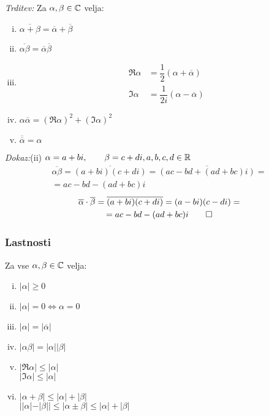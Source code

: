\emph{Trditev:} Za $\alpha, \beta \in \mathbb{C}$ velja:
\begin{enumerate}[(i)]
	\item $\overline{\alpha + \beta} = \overline{\alpha} + \overline{\beta}$
	\item $\overline{\alpha \beta} = \overline{\alpha} \overline{\beta}$
	\item \begin{align*}
	\Re \alpha  &= \dfrac{1}{2} (\alpha + \overline{\alpha})\\
	\Im \alpha &= \dfrac{1}{2i} (\alpha - \overline{\alpha})
	\end{align*}
	
	\item $\alpha \overline{\alpha} = (\Re \alpha)^2 + (\Im \alpha)^2$
	\item $\overline{\overline{\alpha}} = \alpha$
\end{enumerate}

\emph{Dokaz:}(ii) $\alpha = a + bi, \qquad \beta = c + di, a, b, c, d \in \mathbb{R}$
\begin{multline*}
\overline{\alpha \beta}	 = \overline{(a + bi)(c + di)} = \overline{(ac - bd + (ad + bc)i)} = \\
= ac - bd - (ad + bc)i
\end{multline*}
\begin{multline*}
	\overline{\alpha} \cdot \overline{\beta} = \overline{(a + bi)} \overline{(c + di)} = (a-bi)(c-di) =\\
	= ac-bd-(ad+bc)i \qed
\end{multline*}

\subsubsection{Lastnosti} 
Za vse $\alpha, \beta \in \mathbb{C}$ velja:
\begin{enumerate}[(i)]
	\item $|\alpha| \geq 0$
	\item $|\alpha| = 0 \iff \alpha = 0$
	\item $|\alpha| = |\overline{\alpha}|$
	\item $|\alpha \beta| = |\alpha| |\beta|$
	\item $|\Re \alpha| \leq |\alpha|$\\
	$|\Im \alpha| \leq |\alpha|$
	
	\item $|\alpha + \beta| \leq |\alpha| + |\beta|$\\
	$||\alpha| - |\beta|| \leq |\alpha \pm \beta| \leq |\alpha| + |\beta|$
\end{enumerate}

